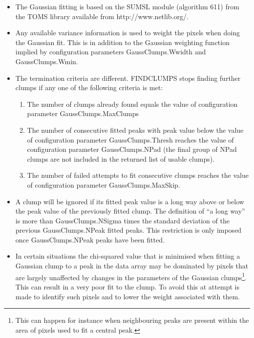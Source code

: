 \documentclass[twoside,11pt]{article}
\newcommand{\htmladdnormallink}[2]{#1}
\renewcommand{\_}{\texttt{\symbol{95}}}
\begin{document}
\begin{itemize}

\item The Gaussian fitting is based on the SUMSL module (algorithm 611)
from the TOMS library available from 
\htmladdnormallink{http://www.netlib.org/}{http://www.netlib.org/}.

\item Any available variance information is used to weight the pixels
when doing the Gaussian fit. This is in addition to the Gaussian
weighting function implied by configuration parameters GaussClumps.Wwidth
and GaussClumps.Wmin.

\item The termination criteria are different. FINDCLUMPS stops finding 
further clumps if any one of the following criteria is met:

\begin{enumerate}

\item The number of clumps already found equals the value of
configuration parameter GaussClumps.MaxClumps

\item The number of consecutive fitted peaks with peak value below the 
value of configuration parameter GaussClumps.Thresh reaches the value of
configuration parameter GaussClumps.NPad (the final group of NPad clumps
are not included in the returned list of usable clumps).

\item The number of failed attempts to fit consecutive clumps reaches
the value of configuration parameter GaussClumps.MaxSkip.

\end{enumerate}

\item A clump will be ignored if its fitted peak value is a long way above or
below the peak value of the previously fitted clump. The definition of
``a long way'' is more than GaussClumps.NSigma times the standard
deviation of the previous GaussClumps.NPeak fitted peaks. This
restriction is only imposed once GaussClumps.NPeak peaks have been fitted.

\item In certain situations the chi-squared value that is minimised when
fitting a Gaussian clump to a peak in the data array may be dominated by
pixels that are largely unaffected by changes in the parameters of the
Gaussian clumps\footnote{This can happen for instance when neighbouring
peaks are present within the area of pixels used to fit a central peak.}.
This can result in a very poor fit to the clump. To avoid this at attempt
is made to identify such pixels and to lower the weight associated with
them.

\end{itemize}
\end{document}
